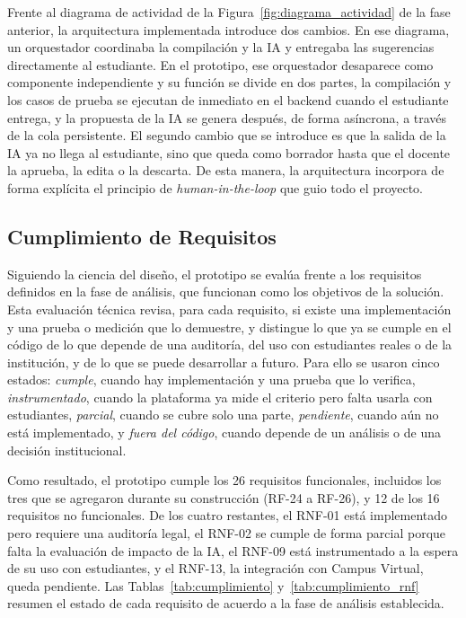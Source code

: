\documentclass[letterpaper, 10 pt, conference]{ieeeconf}
\begin{document}
Frente al diagrama de actividad de la Figura~\ref{fig:diagrama_actividad} de la fase anterior, la arquitectura implementada introduce dos cambios.
En ese diagrama, un orquestador coordinaba la compilación y la IA y entregaba las sugerencias directamente al estudiante.
En el prototipo, ese orquestador desaparece como componente independiente y su función se divide en dos partes, la compilación y los casos de prueba se ejecutan de inmediato en el backend cuando el estudiante entrega, y la propuesta de la IA se genera después, de forma asíncrona, a través de la cola persistente.
El segundo cambio que se introduce es que la salida de la IA ya no llega al estudiante, sino que queda como borrador hasta que el docente la aprueba, la edita o la descarta.
De esta manera, la arquitectura incorpora de forma explícita el principio de \textit{human-in-the-loop} que guio todo el proyecto.

\subsection{Cumplimiento de Requisitos}
Siguiendo la ciencia del diseño, el prototipo se evalúa frente a los requisitos definidos en la fase de análisis, que funcionan como los objetivos de la solución.
Esta evaluación técnica revisa, para cada requisito, si existe una implementación y una prueba o medición que lo demuestre, y distingue lo que ya se cumple en el código de lo que depende de una auditoría, del uso con estudiantes reales o de la institución, y de lo que se puede desarrollar a futuro.
Para ello se usaron cinco estados: \textit{cumple}, cuando hay implementación y una prueba que lo verifica, \textit{instrumentado}, cuando la plataforma ya mide el criterio pero falta usarla con estudiantes, \textit{parcial}, cuando se cubre solo una parte, \textit{pendiente}, cuando aún no está implementado, y \textit{fuera del código}, cuando depende de un análisis o de una decisión institucional.

Como resultado, el prototipo cumple los 26 requisitos funcionales, incluidos los tres que se agregaron durante su construcción (RF-24 a RF-26), y 12 de los 16 requisitos no funcionales.
De los cuatro restantes, el RNF-01 está implementado pero requiere una auditoría legal, el RNF-02 se cumple de forma parcial porque falta la evaluación de impacto de la IA, el RNF-09 está instrumentado a la espera de su uso con estudiantes, y el RNF-13, la integración con Campus Virtual, queda pendiente.
Las Tablas~\ref{tab:cumplimiento} y~\ref{tab:cumplimiento_rnf} resumen el estado de cada requisito de acuerdo a la fase de análisis establecida.
\end{document}
